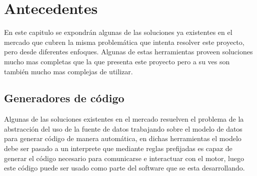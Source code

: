 \chapter{Antecedentes}
En este capitulo se expondrán algunas de las soluciones ya existentes en el mercado que cubren la misma problemática que intenta resolver este proyecto, pero desde diferentes enfoques. Algunas de estas herramientas proveen soluciones mucho mas completas que la que presenta este proyecto pero a su ves son también mucho mas complejas de utilizar.
%
%
\section{Generadores de código}
Algunas de las soluciones existentes en el mercado resuelven el problema de la abstracción del uso de la fuente de datos trabajando sobre el modelo de datos para generar código de manera automática, en dichas herramientas el modelo debe ser pasado a un interprete que mediante reglas prefijadas es capaz de generar el código necesario para comunicarse e interactuar con el motor, luego este código puede ser usado como parte del software que se esta desarrollando.

